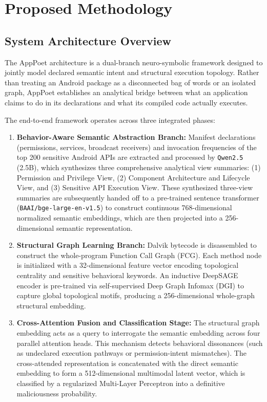 \documentclass[12pt,a4paper,oneside]{report}
\begin{document}
\clearpage
\chapter{Proposed Methodology}
\section{System Architecture Overview}
The AppPoet architecture is a dual-branch neuro-symbolic framework designed to jointly model declared semantic intent and structural execution topology. Rather than treating an Android package as a disconnected bag of words or an isolated graph, AppPoet establishes an analytical bridge between what an application claims to do in its declarations and what its compiled code actually executes.

The end-to-end framework operates across three integrated phases:
\begin{enumerate}
    \item \textbf{Behavior-Aware Semantic Abstraction Branch:} Manifest declarations (permissions, services, broadcast receivers) and invocation frequencies of the top 200 sensitive Android APIs are extracted and processed by \texttt{Qwen2.5} (2.5B), which synthesizes three comprehensive analytical view summaries: (1) Permission and Privilege View, (2) Component Architecture and Lifecycle View, and (3) Sensitive API Execution View. These synthesized three-view summaries are subsequently handed off to a pre-trained sentence transformer (\texttt{BAAI/bge-large-en-v1.5}) to construct continuous 768-dimensional normalized semantic embeddings, which are then projected into a 256-dimensional semantic representation.
    \item \textbf{Structural Graph Learning Branch:} Dalvik bytecode is disassembled to construct the whole-program Function Call Graph (FCG). Each method node is initialized with a 32-dimensional feature vector encoding topological centrality and sensitive behavioral keywords. An inductive DeepSAGE encoder is pre-trained via self-supervised Deep Graph Infomax (DGI) to capture global topological motifs, producing a 256-dimensional whole-graph structural embedding.
    \item \textbf{Cross-Attention Fusion and Classification Stage:} The structural graph embedding acts as a query to interrogate the semantic embedding across four parallel attention heads. This mechanism detects behavioral dissonances (such as undeclared execution pathways or permission-intent mismatches). The cross-attended representation is concatenated with the direct semantic embedding to form a 512-dimensional multimodal latent vector, which is classified by a regularized Multi-Layer Perceptron into a definitive maliciousness probability.
\end{enumerate}
\end{document}
